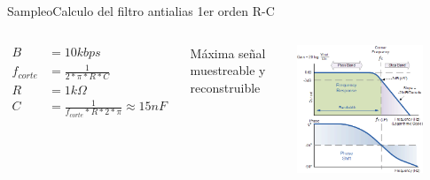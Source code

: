  \begin{frame}{Sampleo}{Calculo del filtro antialias 1er orden R-C}
    \begin{columns}[onlytextwidth]
       \begin{align*}
          B         &= 10k bps \\
          f_{corte} &= \frac{1}{2*\pi*R*C} \\
          R         &= 1k\Omega \\
          C         &= \frac{1}{f_{corte}*R*2*\pi} \approx 15nF
       \end{align*}
          \begin{block}{Máxima señal muestreable y reconstruible}
          \end{block}
       \includegraphics[width=0.8\textwidth]{2_clase/low_pass}
    \end{columns}
    \vfill
 \end{frame}
